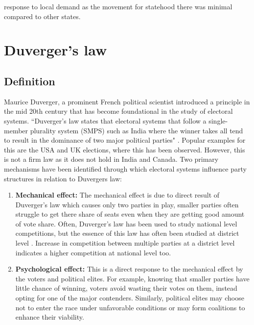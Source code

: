 \begin{sloppypar}
response to local demand as the movement for statehood there was minimal compared to other states.

\section{Duverger's law}
\subsection{Definition}
Maurice Duverger, a prominent French political scientist introduced a principle in the mid 20th century that has  become foundational in the study of electoral systems. ``Duverger's law states that electoral systems that follow a single-member plurality system (SMPS) such as India where the winner takes all tend to result in the dominance of two major political parties" \citep{duverger1954political}. Popular examples for this are the USA and UK elections, where this has been observed. However, this is not a firm law as it does not hold in India and Canada.
Two primary mechanisms have been identified through which electoral systems influence party structures in relation to Duvergers law:
 \begin{enumerate}
     \item \textbf{Mechanical effect:}  The mechanical effect is due to direct result of Duverger's law  which causes only two parties in play, smaller parties often struggle to get there share of seats even when they are getting good amount of vote share. Often, Duverger's law has been used to study national level competitions, but the essence of this law has often been studied at district level \citep{cox1997making,GALLAGHER199133,lijphart1994,rae1971political}. Increase in competition between multiple parties at a district level indicates a higher competition at national level too.
     \item \textbf{Psychological effect:} This is a direct response to the mechanical effect by the voters and political elites. For example, knowing that smaller parties have little chance of winning, voters avoid wasting their votes on them, instead opting for one of the major contenders. Similarly, political elites may choose not to enter the race under unfavorable conditions or may form coalitions to enhance their viability.
 \end{enumerate}

\end{sloppypar}
